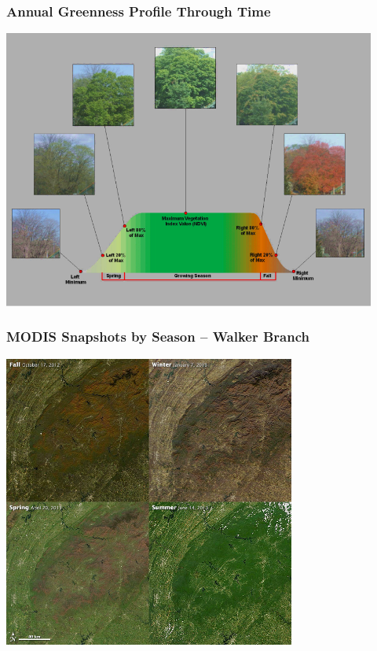 \begin{frame}
 \frametitle{Annual Greenness Profile Through Time}
  \begin{center}
   \vskip-0.05in
   \includegraphics[width=0.92\textwidth]{figures/fancyprofile}
  \end{center}
\end{frame}

{
\begin{frame}
 \frametitle{MODIS Snapshots by Season -- Walker Branch}
  \begin{center}
   \vskip-0.12in
   \includegraphics[width=0.72\textwidth]{figures/WalkerBranch_amo_seasons_2012-13.jpg}
  \end{center}
\end{frame}
}

